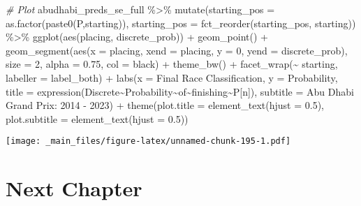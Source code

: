 \documentclass[
]{book}
\newenvironment{Shaded}{\begin{snugshade}}{\end{snugshade}}
\newcommand{\AttributeTok}[1]{\textcolor[rgb]{0.77,0.63,0.00}{#1}}
\newcommand{\CommentTok}[1]{\textcolor[rgb]{0.56,0.35,0.01}{\textit{#1}}}
\newcommand{\DecValTok}[1]{\textcolor[rgb]{0.00,0.00,0.81}{#1}}
\newcommand{\FloatTok}[1]{\textcolor[rgb]{0.00,0.00,0.81}{#1}}
\newcommand{\FunctionTok}[1]{\textcolor[rgb]{0.00,0.00,0.00}{#1}}
\newcommand{\NormalTok}[1]{#1}
\newcommand{\SpecialCharTok}[1]{\textcolor[rgb]{0.00,0.00,0.00}{#1}}
\newcommand{\StringTok}[1]{\textcolor[rgb]{0.31,0.60,0.02}{#1}}
\begin{document}
\begin{Shaded}
\begin{Highlighting}[]
\CommentTok{\# Plot}
\NormalTok{abudhabi\_preds\_se\_full }\SpecialCharTok{\%\textgreater{}\%}
  \FunctionTok{mutate}\NormalTok{(}\AttributeTok{starting\_pos =} \FunctionTok{as.factor}\NormalTok{(}\FunctionTok{paste0}\NormalTok{(}\StringTok{\textquotesingle{}P\textquotesingle{}}\NormalTok{,starting)),}
         \AttributeTok{starting\_pos =} \FunctionTok{fct\_reorder}\NormalTok{(starting\_pos, starting)) }\SpecialCharTok{\%\textgreater{}\%}
  \FunctionTok{ggplot}\NormalTok{(}\FunctionTok{aes}\NormalTok{(placing, discrete\_prob)) }\SpecialCharTok{+}
  \FunctionTok{geom\_point}\NormalTok{() }\SpecialCharTok{+}
  \FunctionTok{geom\_segment}\NormalTok{(}\FunctionTok{aes}\NormalTok{(}\AttributeTok{x =}\NormalTok{ placing, }\AttributeTok{xend =}\NormalTok{ placing, }\AttributeTok{y =} \DecValTok{0}\NormalTok{, }\AttributeTok{yend =}\NormalTok{ discrete\_prob),}
               \AttributeTok{size =} \DecValTok{2}\NormalTok{, }\AttributeTok{alpha =} \FloatTok{0.75}\NormalTok{, }\AttributeTok{col =} \StringTok{\textquotesingle{}black\textquotesingle{}}\NormalTok{) }\SpecialCharTok{+}
  \FunctionTok{theme\_bw}\NormalTok{() }\SpecialCharTok{+}
  \FunctionTok{facet\_wrap}\NormalTok{(}\SpecialCharTok{\textasciitilde{}}\NormalTok{ starting, }\AttributeTok{labeller =}\NormalTok{ label\_both) }\SpecialCharTok{+}
  \FunctionTok{labs}\NormalTok{(}\AttributeTok{x =} \StringTok{\textquotesingle{}Final Race Classification\textquotesingle{}}\NormalTok{,}
       \AttributeTok{y =} \StringTok{\textquotesingle{}Probability\textquotesingle{}}\NormalTok{,}
       \AttributeTok{title =} \FunctionTok{expression}\NormalTok{(Discrete}\SpecialCharTok{\textasciitilde{}}\NormalTok{Probability}\SpecialCharTok{\textasciitilde{}}\NormalTok{of}\SpecialCharTok{\textasciitilde{}}\NormalTok{finishing}\SpecialCharTok{\textasciitilde{}}\NormalTok{P[n]),}
       \AttributeTok{subtitle =} \StringTok{\textquotesingle{}Abu Dhabi Grand Prix: 2014 {-} 2023\textquotesingle{}}\NormalTok{) }\SpecialCharTok{+}
  \FunctionTok{theme}\NormalTok{(}\AttributeTok{plot.title =} \FunctionTok{element\_text}\NormalTok{(}\AttributeTok{hjust =} \FloatTok{0.5}\NormalTok{),}
        \AttributeTok{plot.subtitle =} \FunctionTok{element\_text}\NormalTok{(}\AttributeTok{hjust =} \FloatTok{0.5}\NormalTok{)) }
\end{Highlighting}
\end{Shaded}

\texttt{[image: \_main\_files/figure-latex/unnamed-chunk-195-1.pdf]}

\hypertarget{next-chapter-4}{%
\section{Next Chapter}\label{next-chapter-4}}
\end{document}

